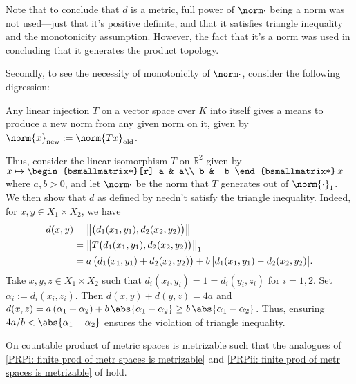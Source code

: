 	\begin{rmk}
		Note that to conclude that $d$ is a metric, full power of $\norm\cdot$ being a norm was not used---just that it's positive definite, and that it satisfies triangle inequality and the monotonicity assumption. However, the fact that it's a norm was used in concluding that it generates the product topology.
		
		Secondly, to see the necessity of monotonicity of $\norm\cdot$, consider the following digression:
		\begin{dgrs}
			Any linear injection $T$ on a vector space over $K$ into itself gives a means to produce a new norm from any given norm on it, given by $\norm{x}_\text{new} := \norm{Tx}_\text{old}$.
			
			Thus, consider the linear isomorphism $T$ on $\mathbb R^2$ given by $x\mapsto 
			\begin{bsmallmatrix*}[r]
				a & a\\
				b & -b
			\end{bsmallmatrix*}\, x$
			where $a, b > 0$, and let $\norm\cdot$ be the norm that $T$ generates out of $\norm{\cdot}_1$.
			We then show that $d$ as defined by  needn't satisfy the triangle inequality. Indeed, for $x, y\in X_1\times X_2$, we have
			\begin{align*}
				d(x, y) 
				& = \left\lVert \bigl( d_1(x_1, y_1), d_2(x_2, y_2) \bigr) \right\lVert\\
				& = \left\lVert T\bigl( d_1(x_1, y_1), d_2(x_2, y_2) \bigr) \right\lVert_1\\
				& = a\,\bigl(d_1(x_1, y_1) + d_2(x_2, y_2)\bigr)
				+ b\,\bigl| d_1(x_1, y_1) - d_2(x_2, y_2) \bigr|\text.
			\end{align*}
			Take $x, y, z\in X_1\times X_2$ such that $d_i(x_i, y_i) = 1 = d_i(y_i, z_i)$ for $i = 1, 2$. Set $\alpha_i := d_i(x_i, z_i)$. Then $d(x, y) + d(y, z) = 4a$ and $d(x, z) = a\,(\alpha_1 + \alpha_2) + b\,\abs{\alpha_1 - \alpha_2}\ge b\, \abs{\alpha_1 - \alpha_2}$. Thus, ensuring $4a/b < \abs{\alpha_1 - \alpha_2}$ ensures the violation of triangle inequality.
		\end{dgrs}
	\end{rmk}
	
	
	\begin{prp}\label{PRP: countable prd's of metr spaces are metrizable}
		On countable product of metric spaces is metrizable such that the analogues of \ref{PRPi: finite prod of metr spaces is metrizable} and \ref{PRPii: finite prod of metr spaces is metrizable} of  hold.
	\end{prp}
	
